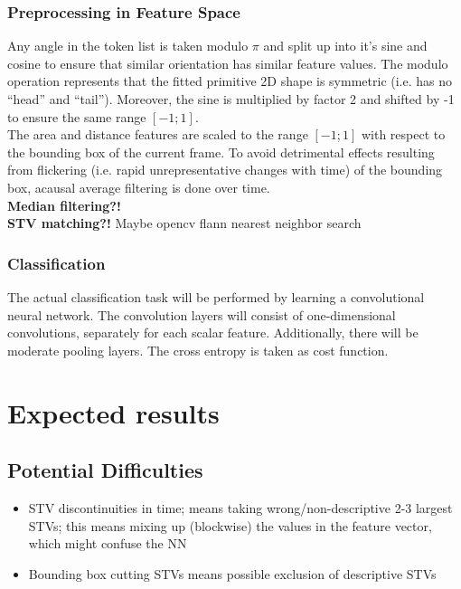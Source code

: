 \documentclass[10pt]{article}
\begin{document}
\subsubsection{Preprocessing in Feature Space}
Any angle in the token list is taken modulo $\pi$ and split up into it's sine and  cosine to ensure that similar orientation has similar feature values. The modulo operation represents that the fitted primitive 2D shape is symmetric (i.e. has no ``head'' and ``tail''). Moreover, the sine is multiplied by factor 2 and shifted by -1 to ensure the same range $[-1;1]$.\\
The area and distance features are scaled to the range $[-1;1]$ with respect to the bounding box of the current frame. To avoid detrimental effects resulting from flickering (i.e. rapid unrepresentative changes with time) of the bounding box, acausal average filtering is done over time.\\
\textbf{Median filtering?!}\\
\textbf{STV matching?!} Maybe opencv flann nearest neighbor search

\subsubsection{Classification}
The actual classification task will be performed by learning a convolutional neural network. The convolution layers will consist of one-dimensional convolutions, separately for each scalar feature. Additionally, there will be moderate pooling layers. The cross entropy is taken as cost function.

\section{Expected results}

\subsection{Potential Difficulties}
\begin{itemize}
\item STV discontinuities in time; means taking wrong/non-descriptive 2-3 largest STVs; this means mixing up (blockwise) the values in the feature vector, which might confuse the NN
\item Bounding box cutting STVs means possible exclusion of descriptive STVs
\end{itemize}


\end{document}
